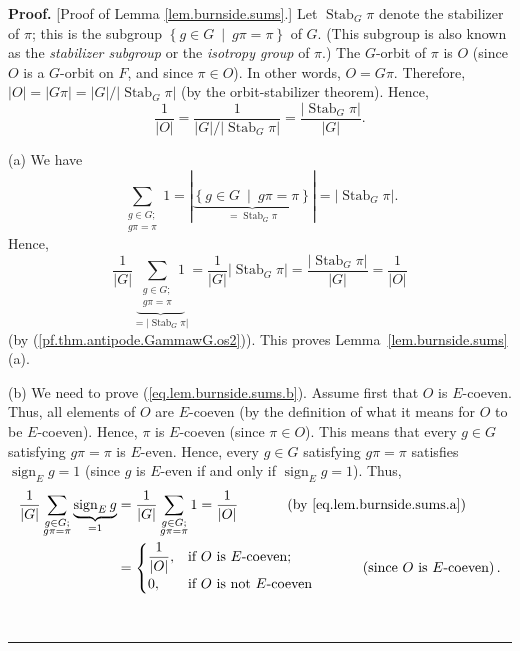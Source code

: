 \documentclass[numbers=enddot,12pt,final,onecolumn,notitlepage,abstracton]{scrartcl}
\theoremstyle{definition}
\newenvironment{proof}[1][Proof]{\noindent\textbf{#1.} }{\ \rule{0.5em}{0.5em}}
\let\sumnonlimits\sum
\renewcommand{\sum}{\sumnonlimits\limits}
\newcommand{\sign}{\operatorname{sign}}
\newcommand{\Stab}{\operatorname{Stab}}
\begin{document}
\begin{proof}
[Proof of Lemma \ref{lem.burnside.sums}.] Let $\Stab_{G}\pi$
denote the stabilizer of $\pi$; this is the subgroup $\left\{  g\in
G\ \mid\ g\pi=\pi\right\}  $ of $G$. (This subgroup is also known as
the \textit{stabilizer subgroup} or the \textit{isotropy group} of
$\pi$.) The $G$-orbit of $\pi$ is $O$ (since $O$
is a $G$-orbit on $F$, and since $\pi\in O$). In other words, $O = G\pi$.
Therefore,
$\left\vert O\right\vert =\left\vert G\pi\right\vert
= \left\vert G\right\vert / \left\vert \Stab_G \pi \right\vert$
(by the orbit-stabilizer theorem). Hence,
\begin{equation}
\dfrac{1}{\left\vert O\right\vert }
= \dfrac{1}{\left\vert G\right\vert / \left\vert \Stab_G \pi \right\vert}
= \dfrac{\left\vert \Stab_G \pi \right\vert}{\left\vert G\right\vert}
.
\label{pf.thm.antipode.GammawG.os2}
\end{equation}


(a) We have%
\[
\sum_{\substack{g\in G;\\g\pi=\pi}}1=\left\vert \underbrace{\left\{  g\in
G\ \mid\ g\pi=\pi\right\}  }_{= \Stab_G \pi
}\right\vert =\left\vert  \Stab_G \pi\right\vert .
\]
Hence,
\[
\dfrac{1}{\left\vert G\right\vert }
\underbrace{\sum_{\substack{g \in G;\\ g \pi = \pi}} 1}_{
 = \left\vert \Stab_G \pi \right\vert}
= \dfrac{1}{\left\vert G\right\vert }
\left\vert \Stab_G \pi \right\vert
= \dfrac{\left\vert \Stab_G \pi \right\vert }{
\left\vert G\right\vert }
= \dfrac{1}{\left\vert O\right\vert }
\]
(by (\ref{pf.thm.antipode.GammawG.os2})). This proves
Lemma~\ref{lem.burnside.sums} (a).

(b) We need to prove (\ref{eq.lem.burnside.sums.b}). Assume first that $O$ is
$E$-coeven. Thus, all elements of $O$ are $E$-coeven (by the
definition of what it means for
$O$ to be $E$-coeven). Hence, $\pi$ is $E$-coeven (since $\pi \in O$).
This means that every $g\in G$ satisfying $g\pi=\pi$ is
$E$-even. Hence, every $g\in G$ satisfying $g\pi=\pi$ satisfies
$\sign_E g = 1$ (since $g$ is $E$-even if and only if
$\sign_E g = 1$). Thus,
\begin{align*}
\dfrac{1}{\left\vert G\right\vert }\sum_{\substack{g\in G;\\g\pi=\pi
}}\underbrace{\sign_E g}_{=1} &  =\dfrac
{1}{\left\vert G\right\vert }\sum_{\substack{g\in G;\\g\pi=\pi}}1=\dfrac
{1}{\left\vert O\right\vert }\ \ \ \ \ \ \ \ \ \ \left(  \text{by
\eqref{eq.lem.burnside.sums.a}}\right)  \\
&  =%
\begin{cases}
\dfrac{1}{\left\vert O\right\vert }, & \text{if }O\text{ is }E\text{-coeven}%
;\\
0, & \text{if }O\text{ is not }E\text{-coeven}%
\end{cases}
\ \ \ \ \ \ \ \ \ \ \left(  \text{since }O\text{ is }E\text{-coeven}\right)  .
\end{align*}



\end{proof}
\end{document}
